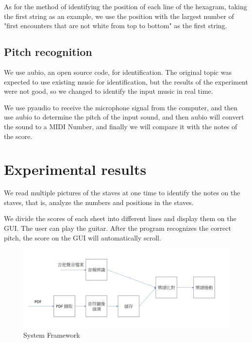 \documentclass[10pt,twocolumn,letterpaper]{article}
\begin{document}
\begin{CJK}{UTF8}{bsmi}
As for the method of identifying the position of each line of the hexagram, taking the first string as an example, we use the position with the largest number of "first encounters that are not white from top to bottom" as the first string.

\subsection{Pitch recognition}

We use aubio, an open source code, for identification. The original topic was expected to use existing music for identification, but the results of the experiment were not good, so we changed to identify the input music in real time.

We use pyaudio to receive the microphone signal from the computer, and then use aubio to determine the pitch of the input sound, and then aubio will convert the sound to a MIDI Number, and finally we will compare it with the notes of the score.

\section{Experimental results}


We read multiple pictures of the staves at one time to identify the notes on the staves, that is, analyze the numbers and positions in the staves.

We divide the scores of each sheet into different lines and display them on the GUI. The user can play the guitar. After the program recognizes the correct pitch, the score on the GUI will automatically scroll.

\begin{figure}[t]
\begin{center}
   \includegraphics[width=0.8\linewidth]{system_framework.png}
\end{center}
   \caption{System Framework}
\label{fig:long}
\label{fig:system_framework}
\end{figure}


\end{CJK}
\end{document}
